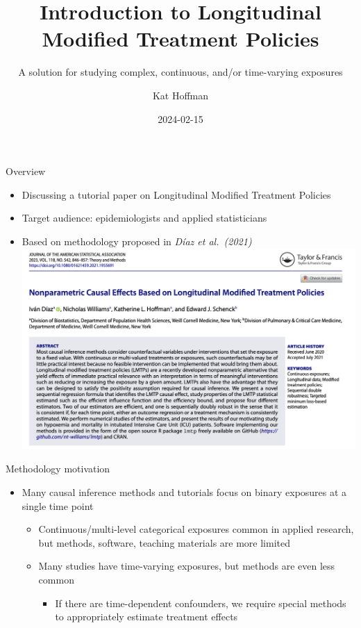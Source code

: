 \documentclass[
  10pt,
  ignorenonframetext,
]{beamer}
\title{Introduction to Longitudinal Modified Treatment Policies}
\subtitle{A solution for studying complex, continuous, and/or
time-varying exposures}
\author{Kat Hoffman}
\date{2024-02-15}
\providecommand{\tightlist}{%
  \setlength{\itemsep}{0pt}\setlength{\parskip}{0pt}}\usepackage{longtable,booktabs,array}
\begin{document}
\frame{\titlepage}
\ifdefined\Shaded\renewenvironment{Shaded}{\begin{tcolorbox}[borderline west={3pt}{0pt}{shadecolor}, enhanced, boxrule=0pt, breakable, sharp corners, interior hidden, frame hidden]}{\end{tcolorbox}}\fi

\begin{frame}{Overview}
\protect\hypertarget{overview}{}
\newcommand{\Pdist}{\mathsf{P}}
\newcommand{\dint}{\mathsf{d}}
\newcommand{\E}{\mathsf{E}}
\newcommand{\Ec}{\mathbb{E}}
\newcommand{\V}{\mathsf{Var}}
\newcommand{\M}{\mathcal{M}}
\newcommand{\1}{\mathbbm{1}}
\newcommand{\pr}{\mathsf{pr}}

\begin{itemize}
\tightlist
\item
  Discussing a tutorial paper on Longitudinal Modified Treatment
  Policies
\item
  Target audience: epidemiologists and applied statisticians
\item
  Based on methodology proposed in \emph{Díaz et al.~(2021)}
  \includegraphics{img/jasa_ss.png}
\end{itemize}
\end{frame}

\begin{frame}{Methodology motivation}
\protect\hypertarget{methodology-motivation}{}
\begin{itemize}
\item
  Many causal inference methods and tutorials focus on binary exposures
  at a single time point

  \begin{itemize}
  \item
    Continuous/multi-level categorical exposures common in applied
    research, but methods, software, teaching materials are more limited
  \item
    Many studies have time-varying exposures, but methods are even less
    common

    \begin{itemize}
    \tightlist
    \item
      If there are time-dependent confounders, we require special
      methods to appropriately estimate treatment effects
    \end{itemize}
  \end{itemize}
\end{itemize}
\end{frame}
\end{document}
